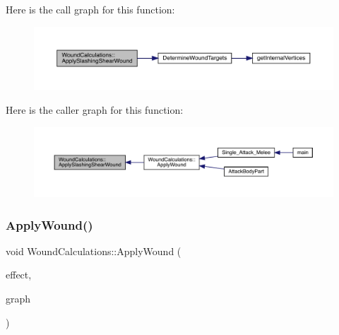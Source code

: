 Here is the call graph for this function\+:
\nopagebreak
\begin{figure}[H]
\begin{center}
\leavevmode
\includegraphics[width=350pt]{class_wound_calculations_ae0e649e97591c6a6b28d6a4ff7e0324e_cgraph}
\end{center}
\end{figure}
Here is the caller graph for this function\+:
\nopagebreak
\begin{figure}[H]
\begin{center}
\leavevmode
\includegraphics[width=350pt]{class_wound_calculations_ae0e649e97591c6a6b28d6a4ff7e0324e_icgraph}
\end{center}
\end{figure}
\mbox{\label{class_wound_calculations_a8143ba01702cf1a1072d17ee7deab4e0}} 
\subsubsection{\texorpdfstring{Apply\+Wound()}{ApplyWound()}}
{\footnotesize\ttfamily void Wound\+Calculations\+::\+Apply\+Wound (\begin{DoxyParamCaption}\item[{\mbox{\hyperlink{struct_applied_force_effect}{Applied\+Force\+Effect}} \&}]{effect,  }\item[{\mbox{\hyperlink{_body_graph_8hpp_ab01b157c2e143191570b012d275fbf0d}{Anatomy\+Graph}} \&}]{graph }\end{DoxyParamCaption})}


